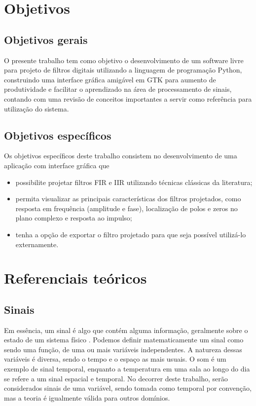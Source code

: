 \documentclass[12pt,a4paper]{report}
\begin{document}
\chapter{Objetivos}
\section{Objetivos gerais}
  O presente trabalho tem como objetivo o desenvolvimento de um software livre para projeto de filtros digitais
  utilizando a linguagem de programação Python, construindo uma interface gráfica amigável em GTK para aumento
  de produtividade e facilitar o aprendizado na área de processamento de sinais, contando com uma revisão de
  conceitos importantes a servir como referência para utilização do sistema.

\section{Objetivos específicos}
Os objetivos específicos deste trabalho consistem no desenvolvimento de uma aplicação com interface gráfica que
  \begin{itemize}
    \item possibilite projetar filtros FIR e IIR utilizando técnicas clássicas da literatura;
    \item permita visualizar as principais características dos filtros projetados, como resposta em frequência
      (amplitude e fase), localização de polos e zeros no plano complexo e resposta ao impulso;
    \item tenha a opção de exportar o filtro projetado para que seja possível utilizá-lo externamente.
  \end{itemize}

\chapter{Referenciais teóricos}
\section{Sinais}
  Em essência, um sinal é algo que contém alguma informação, geralmente sobre o estado de um sistema físico
  \cite{oppenheim}. Podemos definir matematicamente um sinal como sendo uma função, de uma ou mais variáveis
  independentes. A natureza dessas variáveis é diversa, sendo o tempo e o espaço as mais usuais. O som é um
  exemplo de sinal temporal, enquanto a temperatura em uma sala ao longo do dia se refere a um sinal espacial e
  temporal. No decorrer deste trabalho, serão considerados sinais de uma variável, sendo tomada como temporal
  por convenção, mas a teoria é igualmente válida para outros domínios.
\end{document}
